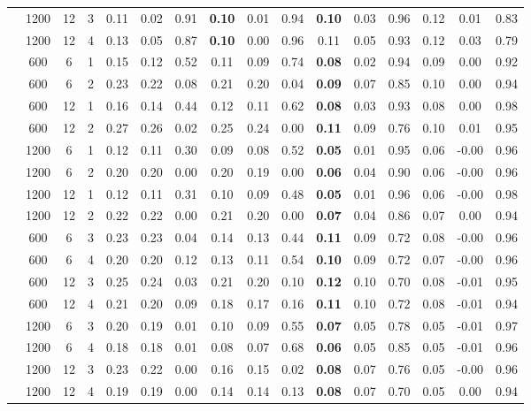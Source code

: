 \begin{table}[ht]
\begin{tabular}{||c|ccc||ccc|ccc|ccc|ccc}
   & 1200 & 12 & 3 & 0.11 & 0.02 & 0.91 & \bf 0.10 & 0.01 & 0.94 & \bf 0.10 & 0.03 & 0.96 & 0.12 & 0.01 & 0.83 \\ 
   & 1200 & 12 & 4 & 0.13 & 0.05 & 0.87 & \bf 0.10 & 0.00 & 0.96 & 0.11 & 0.05 & 0.93 & 0.12 & 0.03 & 0.79 \\ 
   \hline
 & 600 & 6 & 1 & 0.15 & 0.12 & 0.52 & 0.11 & 0.09 & 0.74 & \bf 0.08 & 0.02 & 0.94 & 0.09 & 0.00 & 0.92 \\ 
   & 600 & 6 & 2 & 0.23 & 0.22 & 0.08 & 0.21 & 0.20 & 0.04 & \bf 0.09 & 0.07 & 0.85 & 0.10 & 0.00 & 0.94 \\ 
   & 600 & 12 & 1 & 0.16 & 0.14 & 0.44 & 0.12 & 0.11 & 0.62 & \bf 0.08 & 0.03 & 0.93 & 0.08 & 0.00 & 0.98 \\ 
   & 600 & 12 & 2 & 0.27 & 0.26 & 0.02 & 0.25 & 0.24 & 0.00 & \bf 0.11 & 0.09 & 0.76 & 0.10 & 0.01 & 0.95 \\ 
   & 1200 & 6 & 1 & 0.12 & 0.11 & 0.30 & 0.09 & 0.08 & 0.52 & \bf 0.05 & 0.01 & 0.95 & 0.06 & -0.00 & 0.96 \\ 
   & 1200 & 6 & 2 & 0.20 & 0.20 & 0.00 & 0.20 & 0.19 & 0.00 & \bf 0.06 & 0.04 & 0.90 & 0.06 & -0.00 & 0.96 \\ 
   & 1200 & 12 & 1 & 0.12 & 0.11 & 0.31 & 0.10 & 0.09 & 0.48 & \bf 0.05 & 0.01 & 0.96 & 0.06 & -0.00 & 0.98 \\ 
   & 1200 & 12 & 2 & 0.22 & 0.22 & 0.00 & 0.21 & 0.20 & 0.00 & \bf 0.07 & 0.04 & 0.86 & 0.07 & 0.00 & 0.94 \\ 
   \hline
 & 600 & 6 & 3 & 0.23 & 0.23 & 0.04 & 0.14 & 0.13 & 0.44 & \bf 0.11 & 0.09 & 0.72 & 0.08 & -0.00 & 0.96 \\ 
   & 600 & 6 & 4 & 0.20 & 0.20 & 0.12 & 0.13 & 0.11 & 0.54 & \bf 0.10 & 0.09 & 0.72 & 0.07 & -0.00 & 0.96 \\ 
   & 600 & 12 & 3 & 0.25 & 0.24 & 0.03 & 0.21 & 0.20 & 0.10 & \bf 0.12 & 0.10 & 0.70 & 0.08 & -0.01 & 0.95 \\ 
   & 600 & 12 & 4 & 0.21 & 0.20 & 0.09 & 0.18 & 0.17 & 0.16 & \bf 0.11 & 0.10 & 0.72 & 0.08 & -0.01 & 0.94 \\ 
   & 1200 & 6 & 3 & 0.20 & 0.19 & 0.01 & 0.10 & 0.09 & 0.55 & \bf 0.07 & 0.05 & 0.78 & 0.05 & -0.01 & 0.97 \\ 
   & 1200 & 6 & 4 & 0.18 & 0.18 & 0.01 & 0.08 & 0.07 & 0.68 & \bf 0.06 & 0.05 & 0.85 & 0.05 & -0.01 & 0.96 \\ 
   & 1200 & 12 & 3 & 0.23 & 0.22 & 0.00 & 0.16 & 0.15 & 0.02 & \bf 0.08 & 0.07 & 0.76 & 0.05 & -0.00 & 0.96 \\ 
   & 1200 & 12 & 4 & 0.19 & 0.19 & 0.00 & 0.14 & 0.14 & 0.13 & \bf 0.08 & 0.07 & 0.70 & 0.05 & 0.00 & 0.94 \\ 
   \hline
\hline
\end{tabular}
\end{table}
